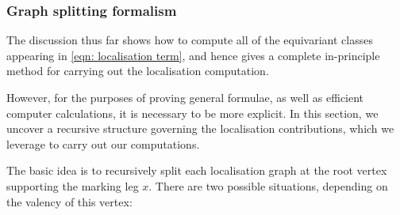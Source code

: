 \documentclass[11pt]{amsart}
\theoremstyle{definition}
\theoremstyle{definition}
\begin{document}
\subsubsection{Graph splitting formalism} \label{sec: graph splitting} The discussion thus far shows how to compute all of the equivariant classes appearing in \eqref{eqn: localisation term}, and hence gives a complete in-principle method for carrying out the localisation computation.

However, for the purposes of proving general formulae, as well as efficient computer calculations, it is necessary to be more explicit. In this section, we uncover a recursive structure governing the localisation contributions, which we leverage to carry out our computations.

The basic idea is to recursively split each localisation graph at the root vertex supporting the marking leg $x$. There are two possible situations, depending on the valency of this vertex:
\end{document}
